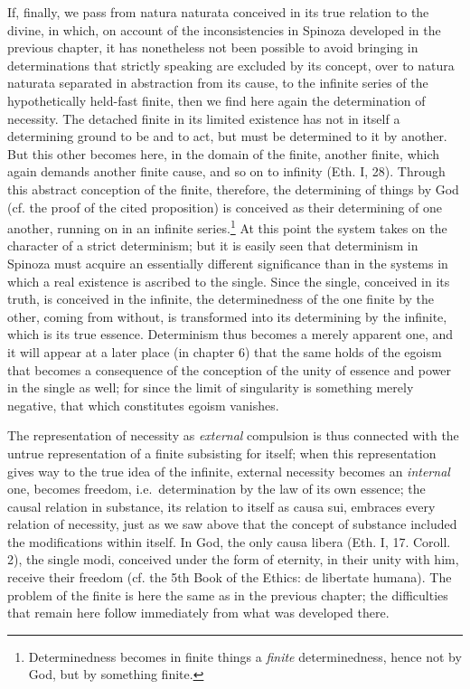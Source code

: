\documentclass[12pt,a4paper,openany]{book}
\newcommand{\opage}[1]{\marginnote{\footnotesize\textit{[#1]}}}
\begin{document}
If, finally, we pass from natura naturata conceived in its true relation to the
divine, in which, on account of the inconsistencies in Spinoza developed in the
previous chapter, it has nonetheless not been possible to avoid bringing in
determinations that strictly speaking are excluded by its concept, over to
natura naturata separated in abstraction from its cause, to the
infinite series of the hypothetically held-fast finite, then we find
here again the determination of necessity. The detached finite in
its limited existence has not in itself a determining ground
to be and to act, but must be determined to it by another. But
this other becomes here, in the domain of the finite, another
finite, which again demands another finite cause, and so on to
infinity (Eth. I, 28). Through this abstract conception of the
finite, therefore, the determining of things by God (cf. the proof
of the cited proposition) is conceived as their determining of one another, running on
in an infinite series.\footnote{Determinedness
becomes in finite things a \textit{finite} determinedness, hence not
by God, but by something finite.} At this point the system takes on
the character of a strict determinism; but it is easily seen that
determinism in Spinoza must acquire an essentially different significance
than in the systems in which a real existence is ascribed to the single.
Since the single, conceived in its truth, is conceived in
the infinite, the determinedness of the one finite by the other, coming from without,
is transformed into its determining by the
infinite, which is its true essence. Determinism thus becomes
a merely apparent one, and
\opage{71} it will appear at a later place (in chapter 6) that the same
holds of the egoism that becomes a consequence of the conception
of the unity of essence and power in the single as well; for since
the limit of singularity is something merely negative, that which
constitutes egoism vanishes.

The representation of necessity as \emph{external} compulsion is thus connected
with the untrue representation of a finite subsisting for itself;
when this representation gives way to the true idea
of the infinite, external necessity becomes an \emph{internal} one, becomes
freedom, i.e.\ determination by the law of its own essence; the causal relation
in substance, its relation to itself as causa sui, embraces
every relation of necessity, just as we saw above that the
concept of substance included the modifications within itself. In God, the
only causa libera (Eth. I, 17. Coroll. 2), the single modi,
conceived under the form of eternity, in their unity with him, receive their
freedom (cf. the 5th Book of the Ethics: de libertate humana). The problem of
the finite is here the same as in the previous chapter; the
difficulties that remain here follow immediately from what was
developed there.
\end{document}
